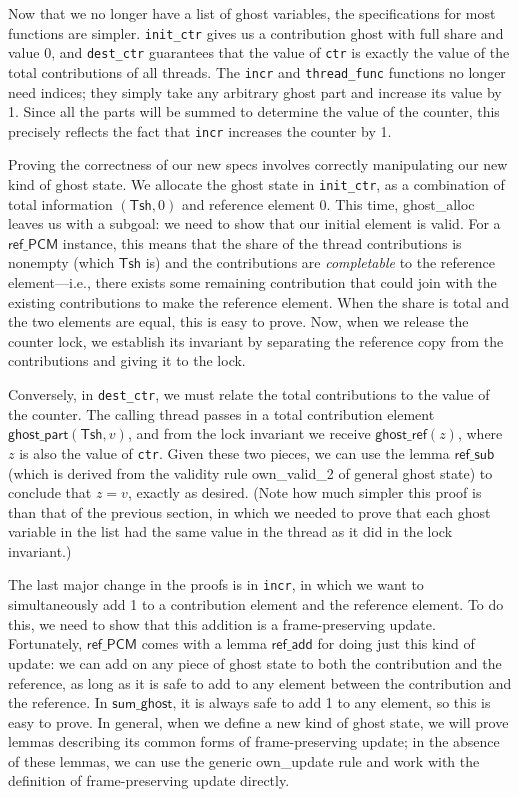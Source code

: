 \documentclass[11pt]{article} %
\begin{document}
Now that we no longer have a list of ghost variables, the specifications for most functions are simpler. \texttt{init\_ctr} gives us a contribution ghost with full share and value 0, and \texttt{dest\_ctr} guarantees that the value of \texttt{ctr} is exactly the value of the total contributions of all threads. The \texttt{incr} and \texttt{thread\_func} functions no longer need indices; they simply take any arbitrary ghost part and increase its value by 1. Since all the parts will be summed to determine the value of the counter, this precisely reflects the fact that \texttt{incr} increases the counter by 1.

Proving the correctness of our new specs involves correctly manipulating our new kind of ghost state. We allocate the ghost state in \texttt{init\_ctr}, as a combination of total information $(\mathsf{Tsh}, 0)$ and reference element $0$. This time, \textsf{ghost\_alloc} leaves us with a subgoal: we need to show that our initial element is valid. For a $\mathsf{ref\_PCM}$ instance, this means that the share of the thread contributions is nonempty (which $\mathsf{Tsh}$ is) and the contributions are \emph{completable} to the reference element---i.e., there exists some remaining contribution that could join with the existing contributions to make the reference element. When the share is total and the two elements are equal, this is easy to prove. Now, when we release the counter lock, we establish its invariant by separating the reference copy from the contributions and giving it to the lock.

Conversely, in \texttt{dest\_ctr}, we must relate the total contributions to the value of the counter. The calling thread passes in a total contribution element $\mathsf{ghost\_part}(\mathsf{Tsh}, v)$, and from the lock invariant we receive $\mathsf{ghost\_ref}(z)$, where $z$ is also the value of \texttt{ctr}. Given these two pieces, we can use the lemma $\mathsf{ref\_sub}$ (which is derived from the validity rule \textsf{own\_valid\_2} of general ghost state) to conclude that $z = v$, exactly as desired. (Note how much simpler this proof is than that of the previous section, in which we needed to prove that each ghost variable in the list had the same value in the thread as it did in the lock invariant.)

The last major change in the proofs is in \texttt{incr}, in which we want to simultaneously add 1 to a contribution element and the reference element. To do this, we need to show that this addition is a frame-preserving update. Fortunately, $\mathsf{ref\_PCM}$ comes with a lemma $\mathsf{ref\_add}$ for doing just this kind of update: we can add on any piece of ghost state to both the contribution and the reference, as long as it is safe to add to any element between the contribution and the reference. In $\mathsf{sum\_ghost}$, it is always safe to add 1 to any element, so this is easy to prove. In general, when we define a new kind of ghost state, we will prove lemmas describing its common forms of frame-preserving update; in the absence of these lemmas, we can use the generic \textsf{own\_update} rule and work with the definition of frame-preserving update directly.
\end{document}
